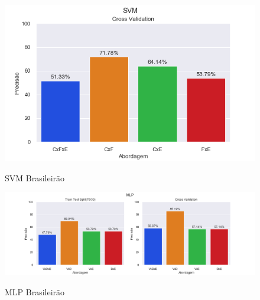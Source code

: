 \begin{figure}[htbp]
  \begin{center}
  \includegraphics[width=0.7\linewidth]{imagens/resultados/svm_br.png}\\
  \end{center}
  \caption[SVM Brasileirão]{SVM Brasileirão}
  \label{fig:logo}
\end{figure}

\begin{figure}[htbp]
  \begin{center}
  \includegraphics[width=1.05\linewidth]{imagens/resultados/mlp_br.png}\\
  \end{center}
  \caption[MLP Brasileirão]{MLP Brasileirão}
  \label{fig:logo}
\end{figure}	  
\break	
	
	
	
	
